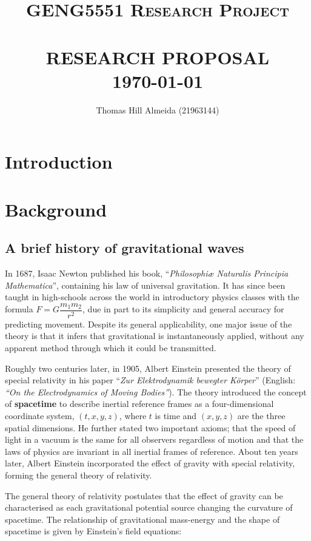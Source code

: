 \documentclass{article}
\title{\normalsize \textsc{GENG5551 Research Project}
        \\ [1.5cm]
        \HRule{0.5pt} \\
        \LARGE \textbf{\uppercase{Research Proposal}}
        \HRule{2pt} \\ [0.5cm]
        \normalsize \today \vspace*{3\baselineskip}}
\author{Thomas Hill Almeida (21963144)}
\date{}
\begin{document}
\maketitle{}
\tableofcontents{}
\newpage{}

\section*{Introduction}
\section{Background}

\subsection{A brief history of gravitational waves}

In 1687, Isaac Newton published his book, ``\textit{Philosophi\ae{} Naturalis Principia Mathematica}'', containing his law of universal gravitation. It has since been taught in high-schools across the world in introductory physics classes with the formula \( F = G\dfrac{m_1m_2}{r^2} \), due in part to its simplicity and general accuracy for predicting movement. Despite its general applicability, one major issue of the theory is that it infers that gravitational is instantaneously applied, without any apparent method through which it could be transmitted.

Roughly two centuries later, in 1905, Albert Einstein presented the theory of special relativity in his paper ``\textit{Zur Elektrodynamik bewegter K{\"o}rper}'' (English: \textit{``On the Electrodynamics of Moving Bodies''}). The theory introduced the concept of \textbf{spacetime} to describe inertial reference frames as a four-dimensional coordinate system, \((t, x, y, z)\), where $t$ is time and $(x, y, z)$ are the three spatial dimensions. He further stated two important axioms; that the speed of light in a vacuum is the same for all observers regardless of motion and that the laws of physics are invariant in all inertial frames of reference. About ten years later, Albert Einstein incorporated the effect of gravity with special relativity, forming the general theory of relativity.

The general theory of relativity postulates that the effect of gravity can be characterised as each gravitational potential source changing the curvature of spacetime. The relationship of gravitational mass-energy and the shape of spacetime is given by Einstein's field equations:
\end{document}
